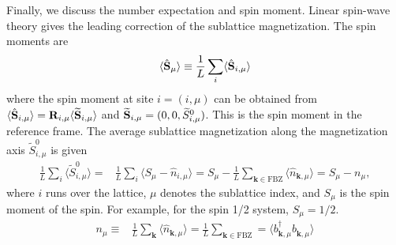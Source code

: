 \documentclass[aps, prx, nofootinbib, superscriptaddress]{revtex4-2}
\newcommand{\kvec}{\mathbf{k}}
\begin{document}
Finally, we discuss the number expectation and spin moment. 
Linear spin-wave theory gives the leading correction of the sublattice magnetization. 
The spin moments are 
\begin{equation}
    \langle \hat{\bf S}_{\mu} \rangle 
    \equiv \frac{1}{L} \sum_{i} \langle \hat{\bf S}_{i, \mu} \rangle
\end{equation}
where the spin moment at site $i=(i,\mu)$ can be obtained from $\langle \hat{\bf S}_{i, \mu} \rangle = \mathbf{R}_{i,\mu} \langle \widetilde{\bf S}_{i,\mu} \rangle$ and $\widetilde{\bf S}_{i,\mu} = (0, 0, \widetilde{S}^{0}_{i,\mu})$. 
This is the spin moment in the reference frame.
The average sublattice magnetization along the magnetization axis $\widetilde{S}^{0}_{i,\mu}$ is given
\begin{align*}
    \frac{1}{L} \sum_{i} \langle \widetilde{S}^{0}_{i, \mu} \rangle 
    = & \frac{1}{L} \sum_{i} \langle S_{\mu} -  \hat{n}_{i, \mu} \rangle 
    = S_{\mu} - \frac{1}{L} \sum_{\kvec \in \mathrm{FBZ}}  \langle \hat{n}_{\kvec, \mu}  \rangle
    = S_{\mu} - n_{\mu},
\end{align*}
where $i$ runs over the lattice, $\mu$ denotes the sublattice index, and $S_{\mu}$ is the spin moment of the spin. 
For example, for the spin 1/2 system, $S_\mu = 1/2$.
\begin{align}
    n_{\mu} \equiv & \frac{1}{L} \sum_{\kvec}  \langle \hat{n}_{\kvec, \mu} \rangle 
    = \frac{1}{L} \sum_{\kvec \in \mathrm{FBZ}} 
    = \langle b^{\dagger}_{\kvec, \mu} b_{\kvec, \mu}^{\phantom \dagger} \rangle  
\end{align}
\end{document}
